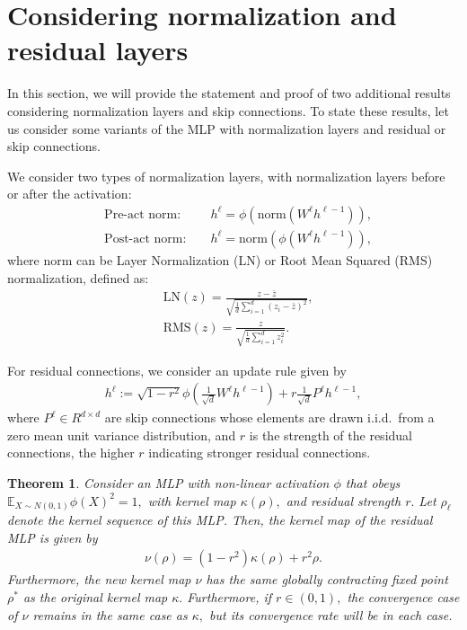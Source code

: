 \documentclass[twoside]{article}
\newcommand{\E}{\mathbb{E}}
\newtheorem{theorem}{Theorem}
\newtheorem{remark}{Remark}
\theoremstyle{definition}
\begin{document}

\section{Considering normalization and residual layers}

In this section, we will provide the statement and proof of two additional results considering normalization layers and skip connections. To state these results, let us consider some variants of the MLP with normalization layers and residual or skip connections. 

We consider two types of normalization layers, with normalization layers before or after the activation: 
\begin{align*}
    & \text{Pre-act norm: } &&h^\ell = \phi\left(\text{norm}\left(W^\ell h^{\ell-1}\right)\right), \\
    & \text{Post-act norm: } &&h^\ell = \text{norm}\left(\phi\left(W^\ell h^{\ell-1}\right)\right), 
\end{align*}
where $\text{norm}$ can be Layer Normalization (LN) or Root Mean Squared (RMS) normalization, defined as:
\begin{align*}
    &\text{LN}(z) = \frac{z - \bar{z}}{\sqrt{\frac1d \sum_{i=1}^d (z_i - \bar{z})^2}}, \\
    &\text{RMS}(z) = \frac{z}{\sqrt{\frac1d \sum_{i=1}^d z_i^2}}.
\end{align*}

For residual connections, we consider an update rule given by 
\begin{align*}
    h^\ell := \sqrt{1-r^2} \phi\left(\frac{1}{\sqrt{d}}W^\ell h^{\ell-1}\right) + r \frac{1}{\sqrt{d}}P^{\ell} h^{\ell-1}, 
\end{align*}
where $P^{\ell}\in R^{d\times d}$ are skip connections whose elements are drawn i.i.d.~from a zero mean unit variance distribution, and $r$ is the strength of the residual connections, the higher $r$ indicating stronger residual connections.   

\begin{theorem}
\label{thm:global_attract_res}
Consider an MLP with non-linear activation $\phi$ that obeys $\E_{X\sim N(0,1)} \phi(X)^2 = 1,$  with kernel map $\kappa(\rho),$ and residual strength $r.$ Let $\rho_\ell$ denote the kernel sequence of this MLP. Then, the kernel map of the residual MLP is given by 
\begin{align*}
    \nu(\rho) = (1-r^2) \kappa(\rho) + r^2 \rho.
\end{align*}
Furthermore, the new kernel map $\nu$ has the same globally contracting fixed point $\rho^*$ as the original kernel map $\kappa.$ Furthermore, if $r\in(0,1),$ the convergence case of $\nu$ remains in the same case  as $\kappa,$ but its convergence rate will be in each case. 
\end{theorem}
\end{document}
